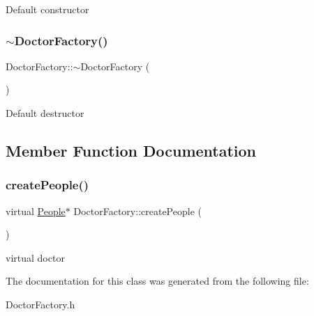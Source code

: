 Default constructor \mbox{\label{classDoctorFactory_a3f2ed2a1a4378d3490c0412645f70767}} 
\subsubsection{\texorpdfstring{$\sim$\+Doctor\+Factory()}{~DoctorFactory()}}
{\footnotesize\ttfamily Doctor\+Factory\+::$\sim$\+Doctor\+Factory (\begin{DoxyParamCaption}{ }\end{DoxyParamCaption})}

Default destructor 

\subsection{Member Function Documentation}
\mbox{\label{classDoctorFactory_a2fead4ec5680093ba93fde6b1b734c59}} 
\subsubsection{\texorpdfstring{create\+People()}{createPeople()}}
{\footnotesize\ttfamily virtual \hyperlink{classPeople}{People}$\ast$ Doctor\+Factory\+::create\+People (\begin{DoxyParamCaption}{ }\end{DoxyParamCaption})\hspace{0.3cm}{\ttfamily [pure virtual]}}

virtual doctor 

The documentation for this class was generated from the following file\+:\begin{DoxyCompactItemize}
\item 
Doctor\+Factory.\+h\end{DoxyCompactItemize}
